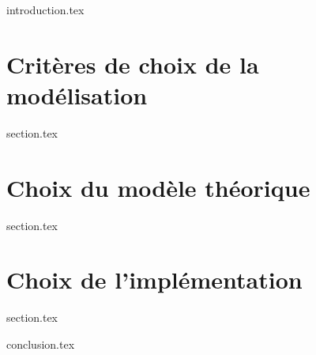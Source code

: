 %

\chaptertoc{}

\label{chap:06-int}
{introduction.tex}

\section{Critères de choix de la modélisation}
\label{chap:06-sec1}
{section.tex}

\section{Choix du modèle théorique}
\label{chap:06-sec2}
{section.tex}

\section{Choix de l'implémentation}
\label{chap:06-sec3}
{section.tex}

\label{chap:06-cnc}
{conclusion.tex}

